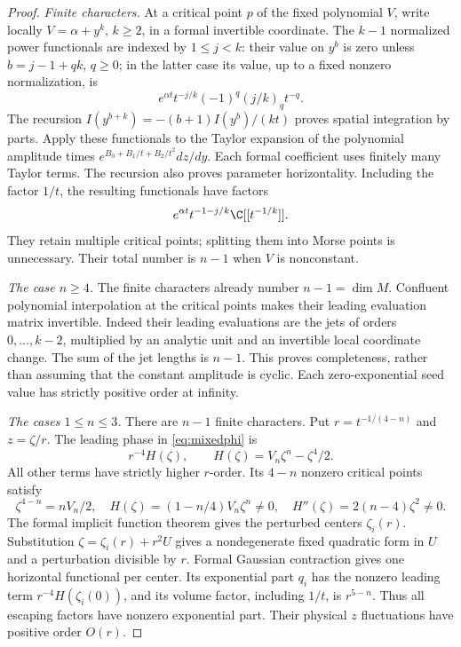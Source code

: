 \begin{proof}
\emph{Finite characters.}
At a critical point $p$ of the fixed polynomial $V$, write locally
$V=\alpha+y^k$, $k\geq2$, in a formal invertible coordinate.
The $k-1$ normalized power functionals are indexed by $1\leq j<k$:
their value on $y^b$ is zero unless $b=j-1+qk$, $q\geq0$;
in the latter case its value, up to a fixed nonzero normalization, is
\[
 e^{\alpha t}t^{-j/k}(-1)^q(j/k)_q t^{-q}.
\]
The recursion $I(y^{b+k})=-(b+1)I(y^b)/(kt)$ proves spatial
integration by parts. Apply these functionals to the Taylor expansion
of the polynomial amplitude times $e^{B_0+B_1/t+B_2/t^2}dz/dy$.
Each formal coefficient uses finitely many Taylor terms. The recursion
also proves parameter horizontality. Including the factor $1/t$, the
resulting functionals have factors
\[
 e^{\alpha t}t^{-1-j/k}\C[[t^{-1/k}]].
\]
They retain multiple critical points; splitting them into Morse points
is unnecessary. Their total number is $n-1$ when $V$ is nonconstant.

\emph{The case $n\geq4$.}
The finite characters already number $n-1=\dim M$.
Confluent polynomial interpolation at the critical points makes their
leading evaluation matrix invertible. Indeed their leading evaluations
are the jets of orders $0,\ldots,k-2$, multiplied by an analytic unit
and an invertible local coordinate change. The sum of the jet lengths
is $n-1$. This proves completeness, rather than assuming that the
constant amplitude is cyclic. Each zero-exponential seed value has
strictly positive order at infinity.

\emph{The cases $1\leq n\leq3$.}
There are $n-1$ finite characters. Put $r=t^{-1/(4-n)}$ and $z=\zeta/r$.
The leading phase in \eqref{eq:mixedphi} is
\[
 r^{-4}H(\zeta),\qquad H(\zeta)=V_n\zeta^n-\zeta^4/2.
\]
All other terms have strictly higher $r$-order. Its $4-n$ nonzero
critical points satisfy
\[
 \zeta^{4-n}=nV_n/2,\quad
 H(\zeta)=(1-n/4)V_n\zeta^n\ne0,\quad
 H''(\zeta)=2(n-4)\zeta^2\ne0.
\]
The formal implicit function theorem gives the perturbed centers
$\zeta_i(r)$. Substitution $\zeta=\zeta_i(r)+r^2U$ gives a
nondegenerate fixed quadratic form in $U$ and a perturbation divisible
by $r$. Formal Gaussian contraction gives one horizontal functional
per center. Its exponential part $q_i$ has the nonzero leading term
$r^{-4}H(\zeta_i(0))$, and its volume factor, including $1/t$, is
$r^{5-n}$. Thus all escaping factors have nonzero exponential part.
Their physical $z$ fluctuations have positive order $O(r)$.


\end{proof}
